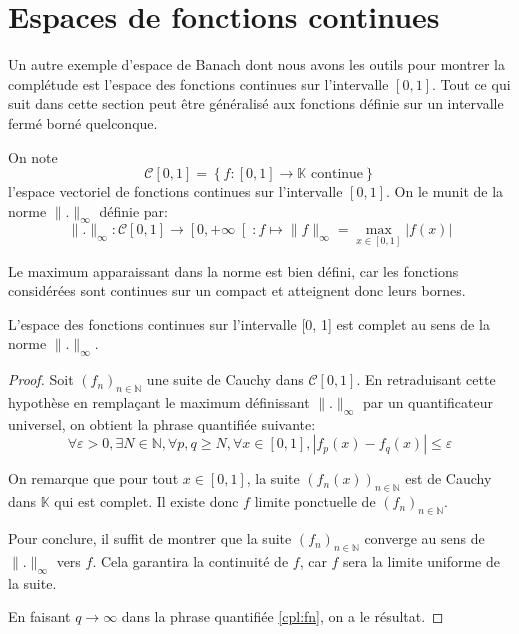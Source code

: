 \section{Espaces de fonctions continues}
Un autre exemple d'espace de Banach dont nous avons
les outils pour montrer la complétude est l'espace
des fonctions continues sur l'intervalle $[0, 1]$.
Tout ce qui suit dans cette section peut être
généralisé aux fonctions définie sur un intervalle
fermé borné quelconque.

\begin{df}
  On note $$\mathscr{C}[0, 1]=\left\{
    f:[0, 1]\to\mathbb{K}\mbox{ continue}\right\}$$
  l'espace vectoriel de fonctions continues sur
  l'intervalle $[0, 1].$
  On le munit de la norme $\|.\|_\infty$ définie par:
  $$\|.\|_\infty:\mathscr{C}[0, 1]\to \left[0, +\infty\right[:
  f\mapsto \|f\|_\infty=\max_{x\in [0, 1]}|f(x)|$$
\end{df}

Le maximum apparaissant dans la norme est bien défini,
car les fonctions considérées sont continues sur un
compact et atteignent donc leurs bornes.

\begin{prop}
  L'espace des fonctions continues sur l'intervalle [0, 1]
  est complet au sens de la norme $\|.\|_\infty$.
\end{prop}

\begin{proof}
  Soit $(f_n)_{n\in\mathbb{N}}$ une suite de Cauchy dans
  $\mathscr{C}[0, 1]$. En retraduisant cette hypothèse
  en remplaçant le maximum définissant $\|.\|_\infty$
  par un quantificateur universel, on obtient la phrase
  quantifiée suivante:
  \begin{equation}\label{cpl:fn}
    \forall \varepsilon>0, \exists N\in\mathbb{N},
  \forall p, q\geq N , \forall x\in [0, 1],
  |f_p(x)-f_q(x)|\leq\varepsilon
  \end{equation}

  On remarque que pour tout $x\in[0, 1]$, la suite
  $(f_n(x))_{n\in\mathbb{N}}$ est de Cauchy dans
  $\mathbb{K}$ qui est complet. Il existe donc
  $f$ limite ponctuelle de $(f_n)_{n\in\mathbb{N}}$.

  Pour conclure, il suffit de montrer que
  la suite $(f_n)_{n\in\mathbb{N}}$ converge
  au sens de $\|.\|_\infty$ vers $f$. Cela
  garantira la continuité de $f$, car $f$
  sera la limite uniforme de la suite.

  En faisant $q\to\infty$ dans la phrase quantifiée
  \ref{cpl:fn}, on a le résultat.

\end{proof}

